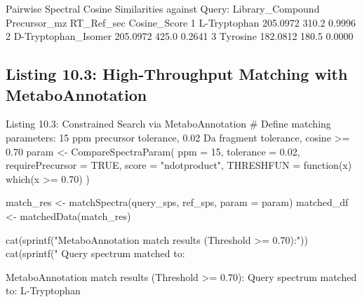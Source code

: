 \documentclass[11pt,twoside,openright]{book}
\begin{document}

\begin{routput}
Pairwise Spectral Cosine Similarities against Query:
     Library\_Compound Precursor\_mz RT\_Ref\_sec Cosine\_Score
1        L-Tryptophan     205.0972      310.2       0.9996
2 D-Tryptophan\_Isomer     205.0972      425.0       0.2641
3            Tyrosine     182.0812      180.5       0.0000
\end{routput}

\subsection{Listing 10.3: High-Throughput Matching with MetaboAnnotation}

\begin{rchunk}{Listing 10.3: Constrained Search via MetaboAnnotation}
# Define matching parameters: 15 ppm precursor tolerance, 0.02 Da fragment tolerance, cosine >= 0.70
param <- CompareSpectraParam(
  ppm              = 15,
  tolerance        = 0.02,
  requirePrecursor = TRUE,
  score            = "ndotproduct",
  THRESHFUN        = function(x) which(x >= 0.70)
)

match_res <- matchSpectra(query_sps, ref_sps, param = param)
matched_df <- matchedData(match_res)

cat(sprintf("MetaboAnnotation match results (Threshold >= 0.70):\n"))
cat(sprintf("  Query spectrum matched to: %
\end{rchunk}

\begin{routput}
MetaboAnnotation match results (Threshold >= 0.70):
  Query spectrum matched to: L-Tryptophan
\end{routput}
\end{document}
